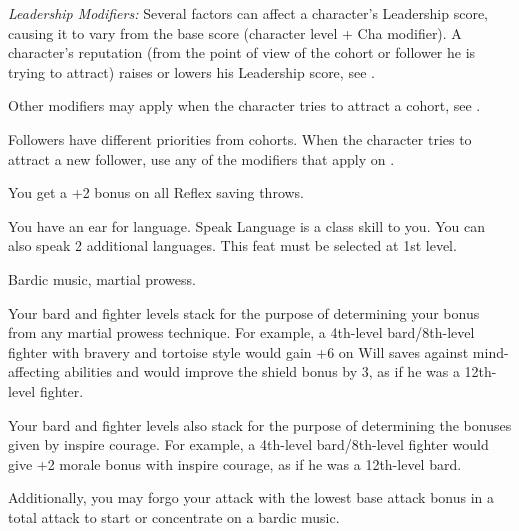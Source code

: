 {\textit{Leadership Modifiers:} Several factors can affect a character's Leadership score, causing it to vary from the base score (character level + Cha modifier). A character's reputation (from the point of view of the cohort or follower he is trying to attract) raises or lowers his Leadership score, see .


Other modifiers may apply when the character tries to attract a cohort, see .


Followers have different priorities from cohorts. When the character tries to attract a new follower, use any of the modifiers that apply on .

}

{You get a +2 bonus on all Reflex saving throws.}

{You have an ear for language.}{}
{Speak Language is a class skill to you. You can also speak 2 additional languages.}{}
{This feat must be selected at 1st level.}

{Bardic music, martial prowess.}
{
Your bard and fighter levels stack for the purpose of determining your bonus from any martial prowess technique. For example, a 4th-level bard/8th-level fighter with bravery and tortoise style would gain +6 on Will saves against mind-affecting abilities and would improve the shield bonus by 3, as if he was a 12th-level fighter.

Your bard and fighter levels also stack for the purpose of determining the bonuses given by inspire courage. For example, a 4th-level bard/8th-level fighter would give +2 morale bonus with inspire courage, as if he was a 12th-level bard.

Additionally, you may forgo your attack with the lowest base attack bonus in a total attack to start or concentrate on a bardic music.
}


